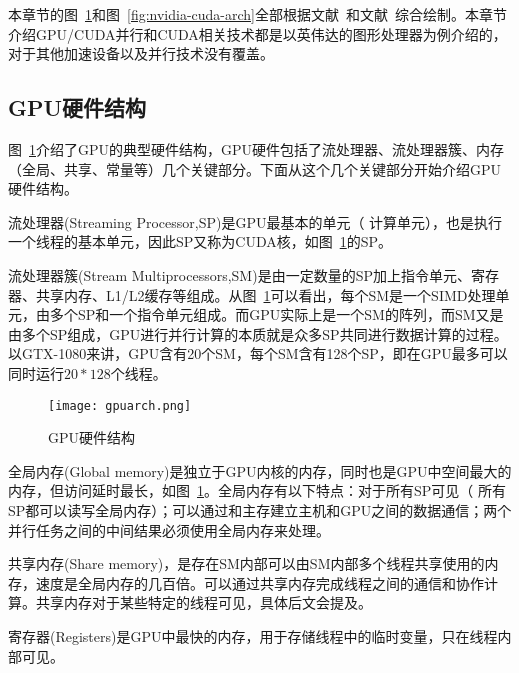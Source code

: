 本章节的图~\ref{fig:GPU-HW-Arch}和图~\ref{fig:nvidia-cuda-arch}全部根据文献~\cite{nickolls2009graphics}和文献~\cite{lippert2009nvidia}综合绘制。本章节介绍GPU/CUDA并行和CUDA相关技术都是以英伟达的图形处理器为例介绍的，对于其他加速设备以及并行技术没有覆盖。
\subsection{GPU硬件结构}
\label{cha:chap03:gpu-Hw}
图~\ref{fig:GPU-HW-Arch}介绍了GPU的典型硬件结构，GPU硬件包括了流处理器、流处理器簇、内存（全局、共享、常量等）几个关键部分。下面从这个几个关键部分开始介绍GPU硬件结构。

流处理器(Streaming Processor,SP)是GPU最基本的单元（ 计算单元），也是执行一个线程的基本单元，因此SP又称为CUDA核，如图~\ref{fig:GPU-HW-Arch}的SP。

流处理器簇(Stream Multiprocessors,SM)是由一定数量的SP加上指令单元、寄存器、共享内存、L1/L2缓存等组成。从图~\ref{fig:GPU-HW-Arch}可以看出，每个SM是一个SIMD处理单元，由多个SP和一个指令单元组成。而GPU实际上是一个SM的阵列，而SM又是由多个SP组成，GPU进行并行计算的本质就是众多SP共同进行数据计算的过程。以GTX-1080来讲，GPU含有20个SM，每个SM含有128个SP，即在GPU最多可以同时运行$20*128$个线程。
\begin{figure}[H] %
	\centering
	\texttt{[image: gpuarch.png]}
	\caption{GPU硬件结构}
	\label{fig:GPU-HW-Arch}
\end{figure}

全局内存(Global  memory)是独立于GPU内核的内存，同时也是GPU中空间最大的内存，但访问延时最长，如图~\ref{fig:GPU-HW-Arch}。全局内存有以下特点：对于所有SP可见（ 所有SP都可以读写全局内存）；可以通过和主存建立主机和GPU之间的数据通信；两个并行任务之间的中间结果必须使用全局内存来处理。

共享内存(Share memory)，是存在SM内部可以由SM内部多个线程共享使用的内存，速度是全局内存的几百倍。可以通过共享内存完成线程之间的通信和协作计算。共享内存对于某些特定的线程可见，具体后文会提及。

寄存器(Registers)是GPU中最快的内存，用于存储线程中的临时变量，只在线程内部可见。

